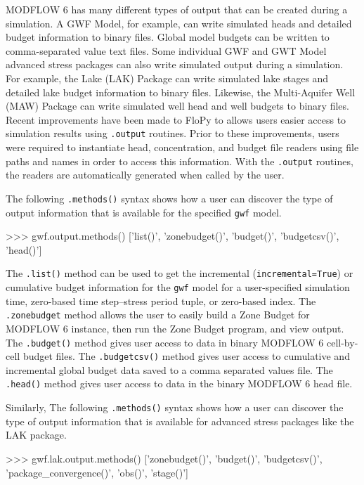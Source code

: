 \documentclass[11pt, oneside]{article}  	%
\begin{document}
MODFLOW 6 has many different types of output that can be created during a simulation. A GWF Model, for example, can write simulated heads and detailed budget information to binary files. Global model budgets can be written to comma-separated value text files. Some individual GWF and GWT Model advanced stress packages can also write simulated output during a simulation. For example, the Lake (LAK) Package can write simulated lake stages and detailed lake budget information to binary files. Likewise, the Multi-Aquifer Well (MAW) Package can write simulated well head and well budgets to binary files. Recent improvements have been made to FloPy to allows users easier access to simulation results using \texttt{.output} routines. Prior to these improvements, users were required to instantiate head, concentration, and budget file readers using file paths and names in order to access this information. With the \texttt{.output} routines, the readers are automatically generated when called by the user.

The following \texttt{.methods()} syntax shows how a user can discover the type of output information that is available for the specified \texttt{gwf} model.

\begin{python}
>>> gwf.output.methods()
['list()', 'zonebudget()', 'budget()', 'budgetcsv()', 'head()']
\end{python}

\noindent The \texttt{.list()} method can be used to get the incremental (\texttt{incremental=True}) or cumulative budget information for the \texttt{gwf} model for a user-specified simulation time, zero-based time step--stress period tuple, or zero-based index. The \texttt{.zonebudget{}} method allows the user to easily build a Zone Budget for MODFLOW 6 instance, then run the Zone Budget program, and view output. The \texttt{.budget()} method gives user access to data in binary MODFLOW 6 cell-by-cell budget files. The \texttt{.budgetcsv()} method gives user access to cumulative and incremental global budget data saved to a comma separated values file. The \texttt{.head()} method gives user access to data in the binary MODFLOW 6 head file.

Similarly, The following \texttt{.methods()} syntax shows how a user can discover the type of output information that is available for advanced stress packages like the LAK package.

\begin{python}
>>> gwf.lak.output.methods()
['zonebudget()', 'budget()', 'budgetcsv()', 'package_convergence()', 'obs()',  'stage()']
\end{python}
\end{document}
